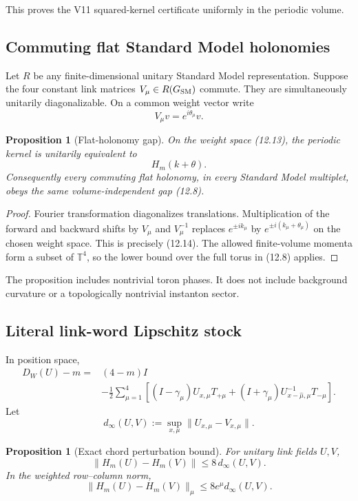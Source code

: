\documentclass[11pt]{article}
\newtheorem{proposition}[theorem]{Proposition}
\begin{document}
This proves the V11 squared-kernel certificate uniformly in the periodic
volume.

\subsection{Commuting flat Standard Model holonomies}

Let \(R\) be any finite-dimensional unitary Standard Model
representation.  Suppose the four constant link matrices
\(V_\mu\in R(G_{\rm SM})\) commute.  They are simultaneously unitarily
diagonalizable.  On a common weight vector write
\[
 V_\mu v=e^{i\theta_\mu}v.
 \tag{12.13}
\]

\begin{proposition}[Flat-holonomy gap]
\label{prop:v11v12-holonomy}
On the weight space (12.13), the periodic kernel is unitarily equivalent
to
\[
 H_m(k+\theta).
 \tag{12.14}
\]
Consequently every commuting flat holonomy, in every Standard Model
multiplet, obeys the same volume-independent gap (12.8).
\end{proposition}

\begin{proof}
Fourier transformation diagonalizes translations.  Multiplication of the
forward and backward shifts by \(V_\mu\) and \(V_\mu^{-1}\) replaces
\(e^{\pm ik_\mu}\) by \(e^{\pm i(k_\mu+\theta_\mu)}\) on the chosen
weight space.  This is precisely (12.14).  The allowed finite-volume
momenta form a subset of \(\mathbb T^4\), so the lower bound over the full
torus in (12.8) applies.
\end{proof}

The proposition includes nontrivial toron phases.  It does not include
background curvature or a topologically nontrivial instanton sector.

\subsection{Literal link-word Lipschitz stock}

In position space,
\[
\begin{split}
 D_W(U)-m
 ={}&(4-m)I\\
 &-\frac12\sum_{\mu=1}^4
 \left[
 (I-\gamma_\mu)U_{x,\mu}T_{+\mu}
 +(I+\gamma_\mu)U_{x-\widehat\mu,\mu}^{-1}T_{-\mu}
 \right].
\end{split}
\tag{12.15}
\]
Let
\[
 d_\infty(U,V):=\sup_{x,\mu}\|U_{x,\mu}-V_{x,\mu}\|.
 \tag{12.16}
\]

\begin{proposition}[Exact chord perturbation bound]
\label{prop:v11v12-lipschitz}
For unitary link fields \(U,V\),
\[
 \|H_m(U)-H_m(V)\|
 \leq8\,d_\infty(U,V).
 \tag{12.17}
\]
In the weighted row--column norm,
\[
 \|H_m(U)-H_m(V)\|_{\mu}
 \leq8e^\mu d_\infty(U,V).
 \tag{12.18}
\]
\end{proposition}
\end{document}
